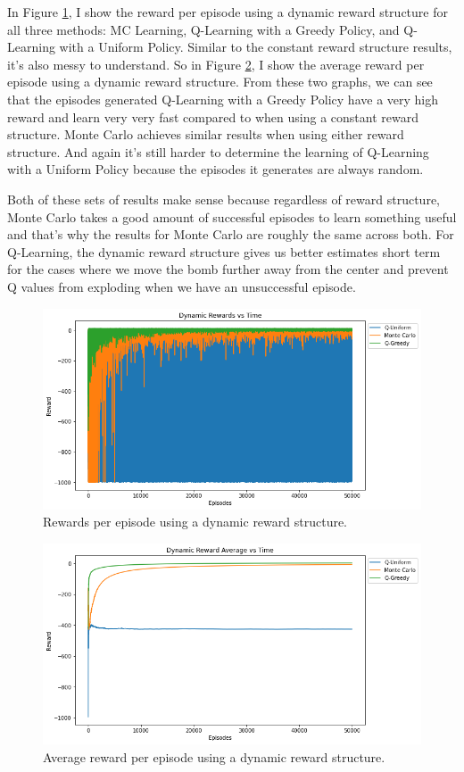 \documentclass[12pt]{article}
\begin{document}
In Figure \ref{fig:drvt}, I show the reward per episode using a dynamic reward structure for all three methods: MC Learning, Q-Learning with a Greedy Policy, and Q-Learning with a Uniform Policy. Similar to the constant reward structure results, it's also messy to understand. So in Figure \ref{fig:drt}, I show the average reward per episode using a dynamic reward structure. From these two graphs, we can see that the episodes generated Q-Learning with a Greedy Policy have a very high reward and learn very very fast compared to when using a constant reward structure. Monte Carlo achieves similar results when using either reward structure. And again it's still harder to determine the learning of Q-Learning with a Uniform Policy because the episodes it generates are always random.

Both of these sets of results make sense because regardless of reward structure, Monte Carlo takes a good amount of successful episodes to learn something useful and that's why the results for Monte Carlo are roughly the same across both. For Q-Learning, the dynamic reward structure gives us better estimates short term for the cases where we move the bomb further away from the center and prevent Q values from exploding when we have an unsuccessful episode.


\begin{figure}
  \includegraphics[width=0.95\linewidth]{Figures/dynamic-rewards-vs-time.png}
  \centering
  \caption{Rewards per episode using a dynamic reward structure.}
  \label{fig:drvt}
\end{figure}

\begin{figure}
  \includegraphics[width=0.95\linewidth]{Figures/dynamic-reward-average-vs-time.png}
  \centering
  \caption{Average reward per episode using a dynamic reward structure.}
  \label{fig:drt}
\end{figure}
\end{document}
